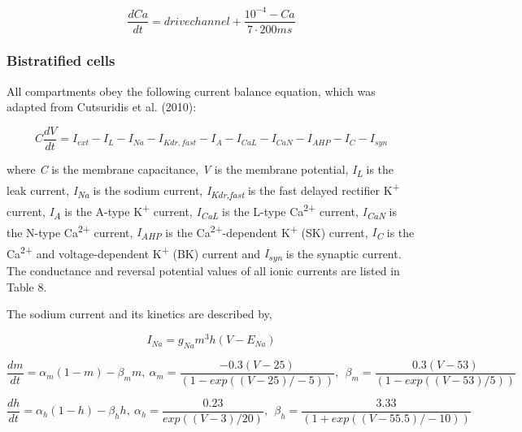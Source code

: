 \documentclass[12pt]{article}
\begin{document}
\begin{equation}
\frac{dCa}{dt}=drivechannel +\frac{10^{-4}-Ca}{7\cdot 200 ms}
\end{equation}




\bigskip

\subsubsection{Bistratified cells}

All compartments obey the following current balance equation, which was adapted from Cutsuridis et al. (2010):


\begin{equation}
C\frac{dV}{dt}=I_{ext}-I_L-I_{Na}-I_{Kdr, fast}-I_A-I_{CaL}-I_{CaN}-I_{AHP}-I_C-I_{syn}
\end{equation}


where \textit{C} is the membrane capacitance, \textit{V} is the membrane potential, \textit{I}\textit{\textsubscript{L}}
is the leak current, \textit{I}\textit{\textsubscript{Na}} is the sodium current,
\textit{I}\textit{\textsubscript{Kdr,fast}} is the fast delayed rectifier K\textsuperscript{+} current,
\textit{I}\textit{\textsubscript{A}} is the A-type K\textsuperscript{+} current, \textit{I}\textit{\textsubscript{CaL}}
is the L-type Ca\textsuperscript{2+} current, \textit{I}\textit{\textsubscript{CaN}} is the N-type
Ca\textsuperscript{2+} current, \textit{I}\textit{\textsubscript{AHP}} is the Ca\textsuperscript{2+}-dependent
K\textsuperscript{+} (SK) current, \textit{I}\textit{\textsubscript{C}} is the Ca\textsuperscript{2+} and
voltage-dependent K\textsuperscript{+} (BK) current and \textit{I}\textit{\textsubscript{syn}} is the synaptic current.
The conductance and reversal potential values of all ionic currents are listed in Table 8. \ \ 



The sodium current and its kinetics are described by,


\begin{equation}
I_{Na}=g_{Na} m^3 h (V-E_{Na})
\end{equation}

\begin{equation}
\frac{dm}{dt}=\alpha_m(1-m)-\beta_mm, \ 
\alpha_m=\frac{-0.3(V-25)}{(1-exp((V-25)/-5))}, \ \  \beta_m=\frac{0.3(V-53)}{(1-exp((V-53)/5))} \ 
\end{equation}

\begin{equation}
\frac{dh}{dt}=\alpha_h(1-h)-\beta_hh, \ 
\alpha_h=\frac{0.23}{exp((V-3)/20)}, \ \  \beta_h=\frac{3.33}{(1+exp((V-55.5)/-10))}\ \ \ 
\end{equation}
\end{document}
